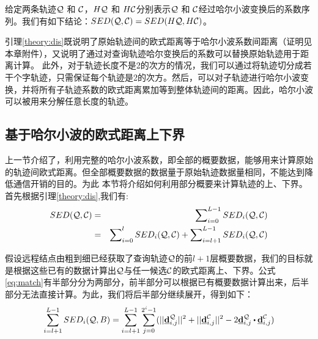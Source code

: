 \begin{lemma}\label{theory:dis}
	给定两条轨迹${\cal Q}$ 和 ${\cal C}$，$H{\cal Q}$ 和 $H{\cal C}$分别表示${\cal Q}$ 和 ${\cal C}$经过哈尔小波变换后的系数序列。我们有如下结论：$SED({\cal Q},{\cal C})=SED(H{\cal Q},H{\cal C})$。
\end{lemma}
引理\ref{theory:dis}既说明了原始轨迹间的欧式距离等于哈尔小波系数间距离（证明见本章附件），又说明了通过对查询轨迹哈尔变换后的系数可以替换原始轨迹用于距离计算。
此外，对于轨迹长度不是2的次方的情况，我们可以通过将轨迹切分成若干个字轨迹，只需保证每个轨迹是2的次方。然后，可以对子轨迹进行哈尔小波变换，并将所有子轨迹系数的欧式距离累加等到整体轨迹间的距离。因此，哈尔小波可以被用来分解任意长度的轨迹。

\subsection{基于哈尔小波的欧式距离上下界}
上一节介绍了，利用完整的哈尔小波系数，即全部的概要数据，能够用来计算原始的轨迹间欧式距离。但全部概要数据的数据量于原始轨迹数据量相同，不能达到降低通信开销的目的。为此
本节将介绍如何利用部分概要来计算轨迹的上、下界。首先根据引理\ref{theory:dis},我们有:
\begin{eqnarray}\label{eq:match}
SED({\cal Q},{\cal C}) &=& \sum\nolimits_{i=0}^{L-1}SED_{i}({\cal Q},{\cal C}) \nonumber\\ 
           &=&\sum\nolimits_{i=0}^{l}SED_{i}({\cal Q},{\cal C})+\sum\nolimits_{i=l+1}^{L-1}SED_{i}({\cal Q},{\cal C})
\end{eqnarray}

假设远程结点由粗到细已经获取了查询轨迹$\cal Q$的前$l+1$层概要数据，我们的目标就是根据这些已有的数据计算出$\cal Q$与任一候选$\cal C$的欧式距离上、下界。公式 \ref{eq:match}有半部分分为两部分，前半部分可以根据已有概要数据计算出来，后半部分无法直接计算。为此，我们将后半部分继续展开，得到如下：
\begin{eqnarray}\label{eq:decompose}
\sum_{i=l+1}^{L-1}SED_{i}({\cal Q},B)= \sum_{i=l+1}^{L-1}\sum_{j=0}^{2^i-1}(||\vd_{i,j}^{\cal Q}||^2+||\vd_{i,j}^{\cal C}||^2 -
2  \vd_{i,j}^{\cal Q} \bigcdot \vd_{i,j}^{\cal C}) 
\end{eqnarray}

